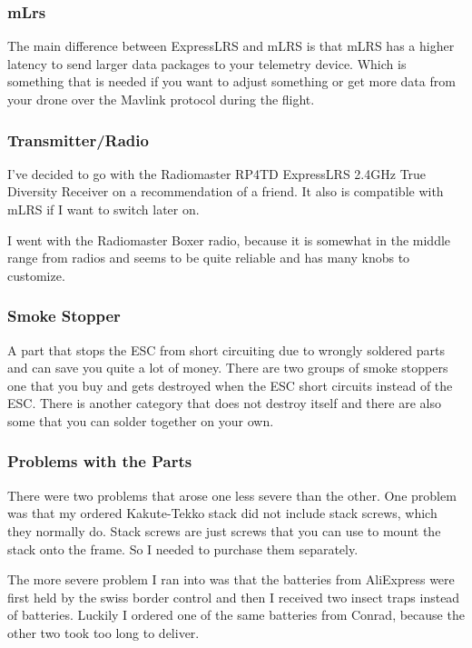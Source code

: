 \documentclass{article}
\begin{document}
	\subsubsection*{mLrs}
	The main difference between ExpressLRS and mLRS is that mLRS has a higher latency to send larger data packages to your telemetry device. Which is something that is needed if you want to adjust something or get more data from your drone over the Mavlink protocol during the flight. 
	
	\subsubsection*{Transmitter/Radio}
	I've decided to go with the Radiomaster RP4TD ExpressLRS 2.4GHz True Diversity Receiver\cite{radiomasterreceiver} on a recommendation of a friend. It also is compatible with mLRS if I want to switch later on.
	
	I went with the Radiomaster Boxer\cite{radiomasterboxer} radio, because it is somewhat in the middle range from radios and seems to be quite reliable and has many knobs to customize. 

	\subsubsection{Smoke Stopper}
	A part that stops the ESC from short circuiting due to wrongly soldered parts and can save you quite a lot of money. There are two groups of smoke stoppers one that you buy and gets destroyed when the ESC short circuits instead of the ESC. There is another category that does not destroy itself and there are also some that you can solder together on your own\cite{smokestopper}. 
	
	\subsubsection{Problems with the Parts}

	There were two problems that arose one less severe than the other. One problem was that my ordered Kakute-Tekko stack did not include stack screws, which they normally do. Stack screws are just screws that you can use to mount the stack onto the frame. So I needed to purchase them separately.
	
	The more severe problem I ran into was that the batteries from AliExpress were first held by the swiss border control and then I received two insect traps instead of batteries. Luckily I ordered one of the same batteries from Conrad, because the other two took too long to deliver.
	
\end{document}
